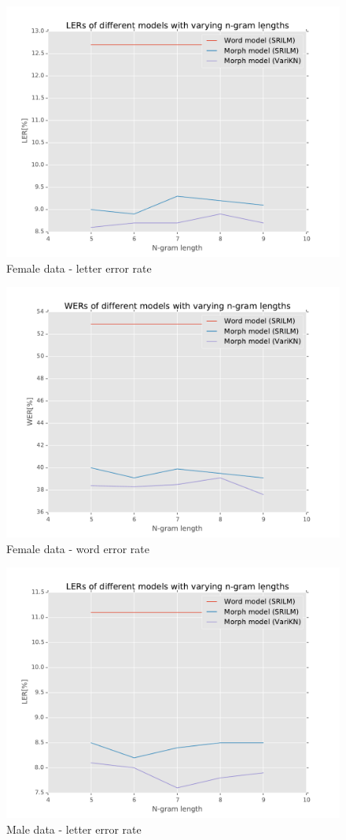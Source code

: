 \documentclass[b5paper]{article}
\begin{document}
\begin{figure}[h!]
\includegraphics[width=.6\textwidth]{figures/smeF-complete_wikipedia-ler}
\caption{Female data - letter error rate}
\end{figure}

\begin{figure}[h!]
\includegraphics[width=.6\textwidth]{figures/smeF-complete_wikipedia-wer}
\caption{Female data - word error rate}
\end{figure}

\begin{figure}[h!]
\includegraphics[width=.6\textwidth]{figures/smeM-complete_wikipedia-ler}
\caption{Male data - letter error rate}
\end{figure}
\end{document}
